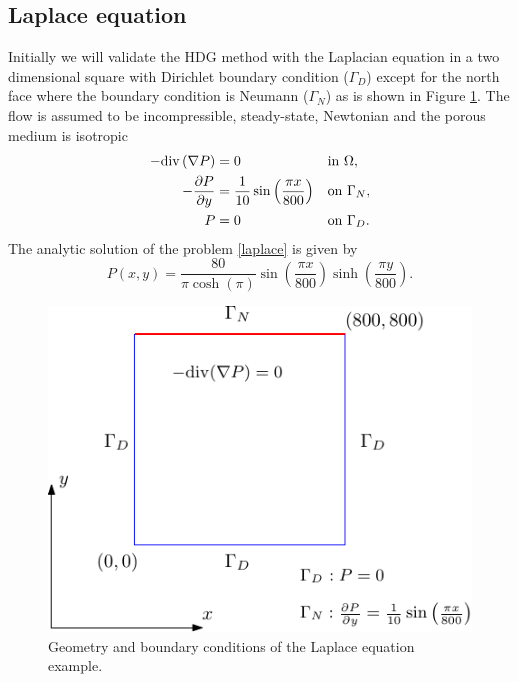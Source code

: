 \documentclass[review]{elsarticle}
\def\dd{{\rm div}}
\def\gp{{\nabla P}}
\begin{document}
\subsection{Laplace equation}
Initially we will validate the HDG method with the Laplacian equation in a two dimensional square with Dirichlet boundary condition ($\Gamma_D$) except for the north face where the boundary condition is Neumann ($\Gamma_N$) as is shown in Figure \ref{fig:cuadrito}.  The flow is assumed to be incompressible, steady-state, Newtonian and the porous medium is isotropic \cite{lynd2016application} 
\begin{equation} 
\label{laplace}
\begin{aligned} 
- \dd\left( \gp \right)  &= 0 & &\mbox{in } \Omega, \\
- \frac{\partial P}{\partial y} &= \frac{1}{10}\sin\left( \frac{\pi x}{800}\right) & & \mbox{on } \Gamma_N,\\
P &= 0 	& & \mbox{on } \Gamma_D. 
\end{aligned}
\end{equation}
The analytic solution of the problem \eqref{laplace} is given by
\begin{equation}
P(x,y) = \frac{80}{\pi \cosh(\pi)} \sin\left( \frac{\pi x}{800}\right) \sinh\left( \frac{\pi y}{800}\right).
\end{equation}
\begin{figure}[H]
	\centering
	\includegraphics[width=0.6\linewidth]{./Figures/Examples/Laplacian/laplacianProblem.pdf}
	\caption{Geometry and boundary conditions of the Laplace equation example.}
	\label{fig:cuadrito}
\end{figure}
\end{document}
